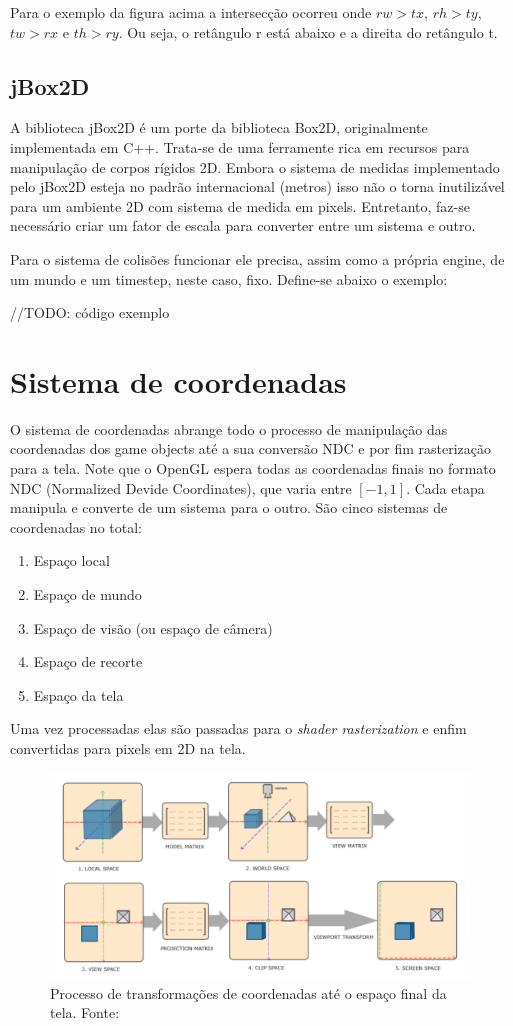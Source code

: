 \documentclass[12pt, 
openright, 
oneside, 
a4paper,    
brazil]{facom-ufu-abntex2}
\begin{document}
Para o exemplo da figura acima a intersecção ocorreu onde $rw > tx$, $rh > ty$, $tw > rx$ e $th > ry$. Ou seja, o retângulo r está abaixo e a direita do retângulo t.

\subsection{jBox2D}

A biblioteca jBox2D é um porte da biblioteca Box2D, originalmente implementada em C++. Trata-se de uma ferramente rica em recursos para manipulação de corpos rígidos 2D. Embora o sistema de medidas implementado pelo jBox2D esteja no padrão internacional (metros) isso não o torna inutilizável para um ambiente 2D com sistema de medida em pixels. Entretanto, faz-se necessário criar um fator de escala para converter entre um sistema e outro.

Para o sistema de colisões funcionar ele precisa, assim como a própria engine, de um mundo e um timestep, neste caso, fixo. Define-se abaixo o exemplo:

//TODO: código exemplo

\section{Sistema de coordenadas}

O sistema de coordenadas abrange todo o processo de manipulação das coordenadas dos game objects até a sua conversão NDC e por fim rasterização para a tela. Note que o OpenGL espera todas as coordenadas finais no formato NDC (Normalized Devide Coordinates), que varia entre $[-1,1]$. Cada etapa manipula e converte de um sistema para o outro. São cinco sistemas de coordenadas no total:

\begin{enumerate}
    \item Espaço local
    \item Espaço de mundo
    \item Espaço de visão (ou espaço de câmera)
    \item Espaço de recorte
    \item Espaço da tela
\end{enumerate}

Uma vez processadas elas são passadas para o \textit{shader rasterization} e enfim convertidas para pixels em 2D na tela.

\begin{figure}[H]
	\centering
	\includegraphics[width=30em]{imagens/coordSpace.png}
	\caption{Processo de transformações de coordenadas até o espaço final da tela. Fonte:~\cite{LearnOpenGL}}
\end{figure}
\end{document}
